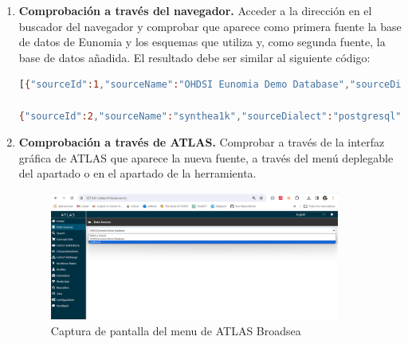 \begin{enumerate}[label=\alph*]

    \item \textbf{Comprobación a través del navegador.} Acceder a la dirección  en el buscador del navegador y comprobar que aparece como primera fuente la base de datos de Eunomia y los esquemas que utiliza y, como segunda fuente, la base de datos añadida. El resultado debe ser similar al siguiente código:

\begin{lstlisting}[language=sh]
[{"sourceId":1,"sourceName":"OHDSI Eunomia Demo Database","sourceDialect":"postgresql","sourceKey":"EUNOMIA","daimons":[{"sourceDaimonId":1,"daimonType":"CDM","tableQualifier":"demo_cdm","priority":0},{"sourceDaimonId":3,"daimonType":"Results","tableQualifier":"demo_cdm_results","priority":0},{"sourceDaimonId":2,"daimonType":"Vocabulary","tableQualifier":"omop_vocab","priority":10}]},

{"sourceId":2,"sourceName":"synthea1k","sourceDialect":"postgresql","sourceKey":"SYNTHEA1K","daimons":[{"sourceDaimonId":4,"daimonType":"CDM","tableQualifier":"cdm\n","priority":1},{"sourceDaimonId":5,"daimonType":"Vocabulary","tableQualifier":"omop_vocab","priority":1},{"sourceDaimonId":6,"daimonType":"Results","tableQualifier":"cdm_results","priority":0}]}]
\end{lstlisting}

    \item \textbf{Comprobación a través de ATLAS.} Comprobar a través de la interfaz gráfica de ATLAS que aparece la nueva fuente, a través del menú deplegable del apartado  o en el apartado  de la herramienta.

\begin{figure}[H]
    \centering
    \includegraphics[width=0.90\textwidth]{figures/showDataSources.png}
    \caption{Captura de pantalla del menu  de ATLAS Broadsea}
    \label{fig:showDataSources}
\end{figure}


\end{enumerate}
